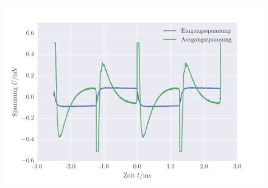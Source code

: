 \FloatBarrier
\begin{figure}[!h]
\centering
\includegraphics[scale=1]{../Grafiken/Differentiator_Oszilloskop_Rechteck.pdf}
\caption{\label{fig:differentiator_oszilloskop_rechteck}}
\end{figure}
\FloatBarrier